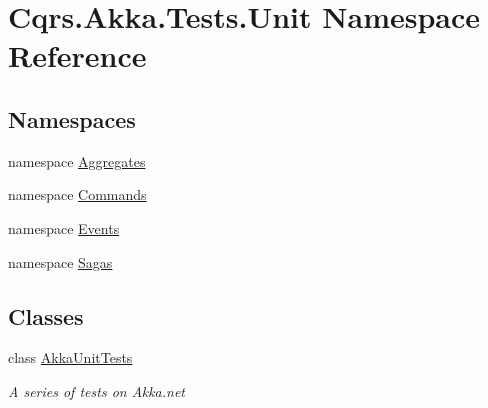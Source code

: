 \hypertarget{namespaceCqrs_1_1Akka_1_1Tests_1_1Unit}{}\section{Cqrs.\+Akka.\+Tests.\+Unit Namespace Reference}
\label{namespaceCqrs_1_1Akka_1_1Tests_1_1Unit}
\subsection*{Namespaces}
\begin{DoxyCompactItemize}
\item 
namespace \hyperlink{namespaceCqrs_1_1Akka_1_1Tests_1_1Unit_1_1Aggregates}{Aggregates}
\item 
namespace \hyperlink{namespaceCqrs_1_1Akka_1_1Tests_1_1Unit_1_1Commands}{Commands}
\item 
namespace \hyperlink{namespaceCqrs_1_1Akka_1_1Tests_1_1Unit_1_1Events}{Events}
\item 
namespace \hyperlink{namespaceCqrs_1_1Akka_1_1Tests_1_1Unit_1_1Sagas}{Sagas}
\end{DoxyCompactItemize}
\subsection*{Classes}
\begin{DoxyCompactItemize}
\item 
class \hyperlink{classCqrs_1_1Akka_1_1Tests_1_1Unit_1_1AkkaUnitTests}{Akka\+Unit\+Tests}
\begin{DoxyCompactList}\small\item\em A series of tests on Akka.\+net \end{DoxyCompactList}\end{DoxyCompactItemize}
